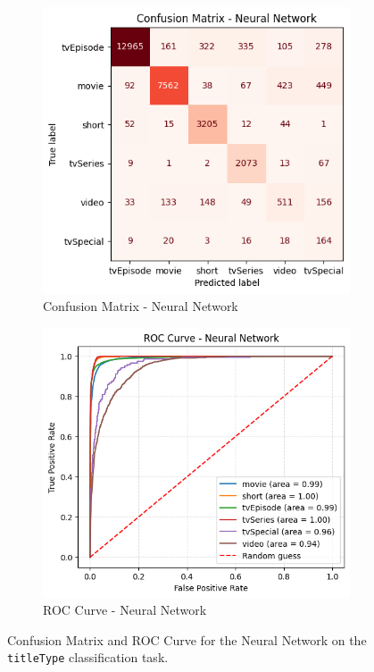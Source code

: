 \begin{figure}[H]
    \centering
    \begin{subfigure}[b]{0.47\textwidth}
        \centering
        \includegraphics[width=\textwidth]{plotsss/cm_nn_titletype.png}
        \caption{Confusion Matrix - Neural Network}
        \label{fig:cm_nn_titletype}
    \end{subfigure}
    \hfill
    \begin{subfigure}[b]{0.50\textwidth}
        \centering
        \includegraphics[width=\textwidth]{plotsss/roc_nn_titletype.png}
        \caption{ROC Curve - Neural Network}
        \label{fig:roc_nn_titletype}
    \end{subfigure}
    \caption{Confusion Matrix and ROC Curve for the Neural Network on the \texttt{titleType} classification task.}
    \label{fig:cm_roc_nn_titletype}
\end{figure}

